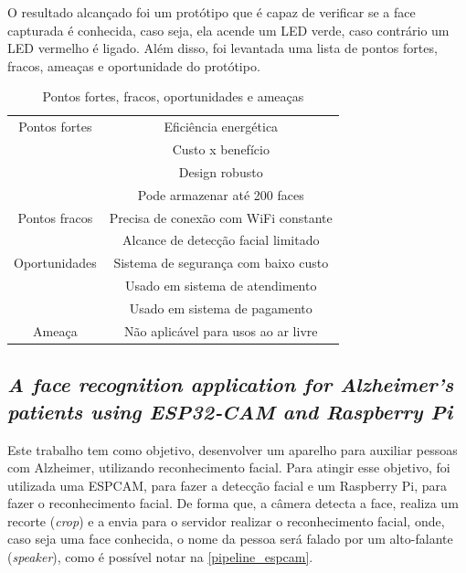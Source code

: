 O resultado alcançado foi um protótipo que é capaz de verificar se a face capturada é conhecida, caso seja, ela acende um
LED verde, caso contrário um LED vermelho é ligado. Além disso, foi levantada uma lista de pontos fortes, fracos, ameaças
e oportunidade do protótipo.

\begin{center}
\begin{table}[htb]
\centering
\ABNTEXfontereduzida
\caption[Pontos fortes, fracos, oportunidades e ameaças]{Pontos fortes, fracos, oportunidades e ameaças}
\label{tabela_swot}
\begin{tabular}{ |c|c| }
	\hline
	Pontos fortes & Eficiência energética \\
		    & Custo x benefício \\
		    & Design robusto \\
		    & Pode armazenar até 200 faces \\
	\hline
	Pontos fracos & Precisa de conexão com WiFi constante \\
	 	    & Alcance de detecção facial limitado \\
	\hline
	Oportunidades & Sistema de segurança com baixo custo\\
		 & Usado em sistema de atendimento \\
		 & Usado em sistema de pagamento \\
	\hline
	Ameaça & Não aplicável para usos ao ar livre \\
	\hline
\end{tabular}
\end{table}
\end{center}

\subsection{\textit{A face recognition application for Alzheimer’s patients using ESP32‑CAM and Raspberry Pi}}
Este trabalho \cite{espcamAlzheimer} tem como objetivo, desenvolver um aparelho para auxiliar pessoas com Alzheimer,
utilizando reconhecimento facial. Para atingir esse objetivo, foi utilizada uma ESPCAM, para fazer a detecção facial
e um Raspberry Pi, para fazer o reconhecimento facial. De forma que, a câmera detecta a face, realiza um recorte
(\textit{crop}) e a envia para o servidor realizar o reconhecimento facial, onde, caso seja uma face conhecida, o nome da pessoa será
falado por um alto-falante (\textit{speaker}), como é possível notar na \autoref{pipeline_espcam}.

